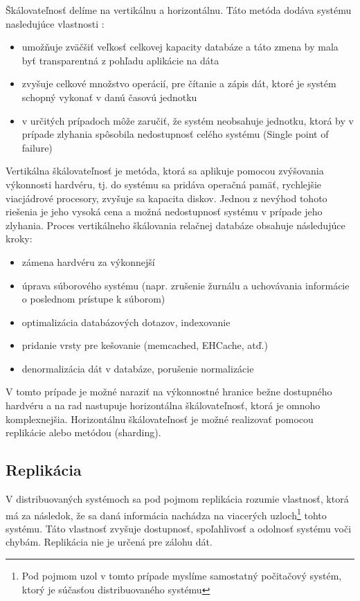 \documentclass[11pt,twoside,a4paper]{book}
\begin{document}
Škálovateľnosť delíme na vertikálnu a horizontálnu. Táto metóda dodáva systému nasledujúce vlastnosti \cite{hewitt2010cassandra}:
\begin{itemize}
 \item umožňuje zväčšiť veľkosť celkovej kapacity databáze a táto zmena by mala byť transparentná z pohľadu aplikácie na dáta
  \item zvyšuje celkové množstvo operácií, pre čítanie a zápis dát, ktoré je systém schopný vykonať v danú časovú jednotku
  \item v určitých prípadoch môže zaručiť, že systém neobsahuje jednotku, ktorá by v prípade zlyhania spôsobila nedostupnosť celého systému (Single point of failure)
\end{itemize}

Vertikálna škálovateľnosť je metóda, ktorá sa aplikuje pomocou zvýšovania výkonnosti hardvéru, tj. do systému sa pridáva operačná pamäť, rychlejšie viacjádrové procesory, zvyšuje sa kapacita diskov. Jednou z nevýhod tohoto riešenia je jeho vysoká cena a možná nedostupnosť systému v prípade jeho zlyhania.
Proces vertikálneho škálovania relačnej databáze obsahuje následujúce kroky:
\begin{itemize}
 \item zámena hardvéru za výkonnejší
 \item úprava súborového systému (napr. zrušenie žurnálu a uchovávania informácie o poslednom prístupe k súborom)
 \item optimalizácia databázových dotazov, indexovanie
 \item pridanie vrsty pre kešovanie (memcached, EHCache, atď.)
 \item denormalizácia dát v databáze, porušenie normalizácie
\end{itemize}

V tomto prípade je možné naraziť na výkonnostné hranice bežne dostupného hardvéru a na rad nastupuje horizontálna škálovateľnosť, ktorá je omnoho komplexnejšia. Horizontálnu škálovateľnosť je možné realizovať pomocou replikácie alebo metódou  (sharding).

\subsection{Replikácia}

V distribuovaných systémoch sa pod pojmom replikácia rozumie vlastnosť, ktorá má za následok, že sa daná informácia nachádza na viacerých uzloch\footnote{Pod pojmom uzol v tomto prípade myslíme samostatný počitačový systém, ktorý je súčasťou distribuovaného systému} tohto systému. Táto vlastnosť zvyšuje dostupnosť, spoľahlivosť a odolnosť systému voči chybám. Replikácia nie je určená pre zálohu dát. 
\end{document}
